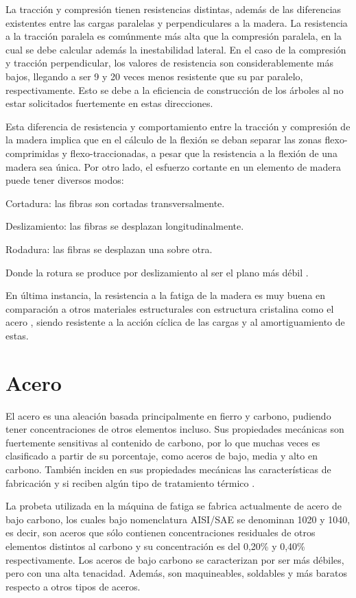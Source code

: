 La tracción y compresión tienen resistencias distintas, además de las diferencias existentes entre las cargas paralelas y perpendiculares a la madera. La resistencia a la tracción paralela es comúnmente más alta que la compresión paralela, en la cual se debe calcular además la inestabilidad lateral. En el caso de la compresión y tracción perpendicular, los valores de resistencia son considerablemente más bajos, llegando a ser 9 y 20 veces menos resistente que su par paralelo, respectivamente. Esto se debe a la eficiencia de construcción de los árboles al no estar solicitados fuertemente en estas direcciones. 

Esta diferencia de resistencia y comportamiento entre la tracción y compresión de la madera implica que en el cálculo de la flexión se deban separar las zonas flexo-comprimidas y flexo-traccionadas, a pesar que la resistencia a la flexión de una madera sea única. Por otro lado, el esfuerzo cortante en un elemento de madera puede tener diversos modos:
\begin{itemize*}
	\item Cortadura: las fibras son cortadas transversalmente.
	\item Deslizamiento: las fibras se desplazan longitudinalmente.
	\item Rodadura: las fibras se desplazan una sobre otra.
\end{itemize*}
Donde la rotura se produce por deslizamiento al ser el plano más débil \cite{steiger2017basics}.

En última instancia, la resistencia a la fatiga de la madera es muy buena en comparación a otros materiales estructurales con estructura cristalina como el acero \cite{sanchez2014guia}, siendo resistente a la acción cíclica de las cargas y al amortiguamiento de estas. 

\section{Acero}
El acero es una aleación basada principalmente en fierro y carbono, pudiendo tener concentraciones de otros elementos incluso. Sus propiedades mecánicas son fuertemente sensitivas al contenido de carbono, por lo que muchas veces es clasificado a partir de su porcentaje, como aceros de bajo, media y alto en carbono. También inciden en sus propiedades mecánicas las características de fabricación y si reciben algún tipo de tratamiento térmico \cite{callister2001fundamentals}.

La probeta utilizada en la máquina de fatiga se fabrica actualmente de acero de bajo carbono, los cuales bajo nomenclatura AISI/SAE se denominan 1020 y 1040, es decir, son aceros que sólo contienen concentraciones residuales de otros elementos distintos al carbono y su concentración es del 0,20\% y 0,40\% respectivamente. Los aceros de bajo carbono se caracterizan por ser más débiles, pero con una alta tenacidad. Además, son maquineables, soldables y más baratos respecto a otros tipos de aceros.

